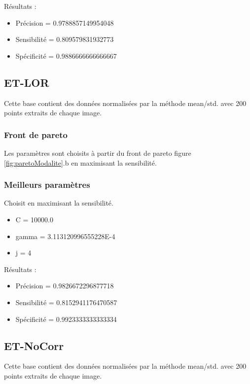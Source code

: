 Résultats :

\begin{itemize}
\item Précision = 0.9788857149954048
\item Sensibilité = 0.809579831932773
\item Spécificité = 0.9886666666666667
\end{itemize}


\subsection{ET-LOR}

Cette base contient des données normalisées par la méthode mean/std. avec 200 points extraits de chaque image.

\subsubsection{Front de pareto}

Les paramètres sont choisits à partir du front de pareto figure \ref{fig:paretoModalite}.b en maximisant la sensibilité.


\subsubsection{Meilleurs paramètres}

Choisit en maximisant la sensibilité.

\begin{itemize}
\item C = 10000.0
\item gamma = 3.113120996555228E-4
\item j = 4
\end{itemize}

Résultats :

\begin{itemize}
\item Précision = 0.9826672296877718
\item Sensibilité = 0.8152941176470587
\item Spécificité = 0.9923333333333334
\end{itemize}

\subsection{ET-NoCorr}

Cette base contient des données normalisées par la méthode mean/std. avec 200 points extraits de chaque image.

